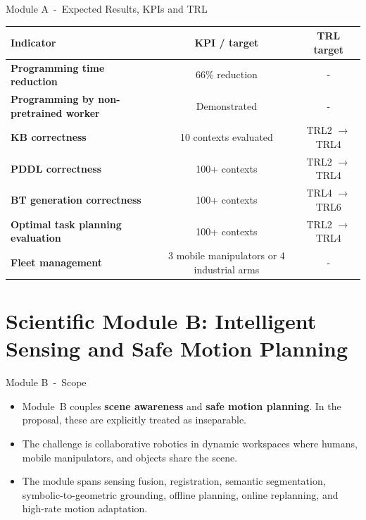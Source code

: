 \documentclass[aspectratio=169,10pt]{beamer}
\begin{document}
\begin{frame}{Module A~-~Expected Results, KPIs and TRL}

\small
\begin{tabularx}{\textwidth}{>{\bfseries}X c c}
\toprule
Indicator & KPI / target & TRL target \\
\midrule
Programming time reduction & 66\% reduction &~-~\\
Programming by non-pretrained worker & Demonstrated &~-~\\
KB correctness & 10 contexts evaluated & TRL2 $\rightarrow$ TRL4 \\
PDDL correctness & 100+ contexts & TRL2 $\rightarrow$ TRL4 \\
BT generation correctness & 100+ contexts & TRL4 $\rightarrow$ TRL6 \\
Optimal task planning evaluation & 100+ contexts & TRL2 $\rightarrow$ TRL4 \\
Fleet management & 3 mobile manipulators or 4 industrial arms &~-~\\
\bottomrule
\end{tabularx}

\end{frame}


\section{Scientific Module B: Intelligent Sensing and Safe Motion Planning}

\begin{frame}{Module B~-~Scope}

\begin{itemize}
  \item Module~B couples \textbf{scene awareness} and \textbf{safe motion planning}. In the proposal, these are explicitly treated as inseparable.
  \item The challenge is collaborative robotics in dynamic workspaces where humans, mobile manipulators, and objects share the scene.
  \item The module spans sensing fusion, registration, semantic segmentation, symbolic-to-geometric grounding, offline planning, online replanning, and high-rate motion adaptation.
\end{itemize}

\end{frame}
\end{document}
